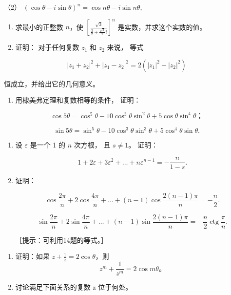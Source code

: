 （2）
\((\cos \theta - i \sin \theta)^n = \cos n\theta - i \sin n\theta,\)

\begin{enumerate}[start=11]
\item
  求最小的正整数 \(n\)，使
  \(\left[\frac{\sqrt{3}}{\frac{3}{2} + \frac{\sqrt{3}}{2}i}\right]^n\)
  是实数，并求这个实数的值。
\item
  证明： 对于任何复数 \(z_{1}\) 和 \(z_{2}\) 来说， 等式
\end{enumerate}

\[
\left| z _ {1} + z _ {2} \right| ^ {2} + \left| z _ {1} - z _ {2} \right| ^ {2} = 2 (\left| z _ {1} \right| ^ {2} + \left| z _ {2} \right| ^ {2})
\]

恒成立，并给出它的几何意义。

\begin{enumerate}[start=13]
\item
  用棣美弗定理和复数相等的条件， 证明：
\end{enumerate}

\[
\cos 5 \theta = \cos^ {5} \theta - 10 \cos^ {3} \theta \sin^ {2} \theta + 5 \cos \theta \sin^ {4} \theta \text{；}
\]

\[
\sin 5 \theta = \sin^ {5} \theta - 10 \cos^ {3} \theta \sin^ {3} \theta + 5 \cos^ {4} \theta \sin \theta .
\]

\begin{enumerate}[start=14,label={*\arabic*.}]
\item
  设 \(\varepsilon\) 是一个 1 的 \(n\) 次方根， 且 \(s \neq 1\)。
证明：

\[
1 + 2 \varepsilon + 3 \varepsilon^ {2} + \dots + n \varepsilon^ {n - 1} = - \frac {n}{1 - s}.
\]

\item
  证明：

\[
\cos \frac {2 \pi}{n} + 2 \cos \frac {4 \pi}{n} + \dots + (n - 1) \cos \frac {2 (n - 1) \pi}{n} = - \frac {n}{2}.
\]

\[
\sin \frac {2 \pi}{n} + 2 \sin \frac {4 \pi}{n} + \dots + (n - 1) \sin \frac {2 (n - 1) \pi}{n} = - \frac {n}{2} \operatorname{ctg} \frac {\pi}{n}.
\]

［提示：可利用14题的等式。］

\end{enumerate}
\begin{enumerate}[start=16]
\item
  证明：如果 \(z + \frac{1}{z} = 2\cos \theta\)，则
\[
z^m+\frac1{z^m}=2\cos m\theta\text{。}
\]
\item
  讨论满足下面关系的复数 z 位于何处。
\end{enumerate}

